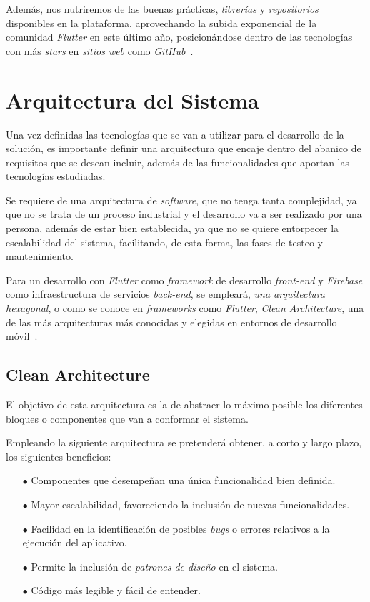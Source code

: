 Además, nos nutriremos de las buenas prácticas, \textit{librerías} y \textit{repositorios} disponibles en la plataforma,
aprovechando la subida exponencial de la comunidad \textit{Flutter} en este último año, posicionándose
dentro de las tecnologías con más \textit{stars} en \textit{sitios web} como \textit{GitHub}~\cite{gittracker}.

\section{Arquitectura del Sistema}
Una vez definidas las tecnologías que se van a utilizar para el desarrollo de la solución, es importante definir una 
arquitectura que encaje dentro del abanico de requisitos que se desean incluir, además de las funcionalidades que
aportan las tecnologías estudiadas.

Se requiere de una arquitectura de \textit{software}, que no tenga tanta complejidad, ya que no se trata de un
proceso industrial y el desarrollo va a ser realizado por una persona, además de estar bien establecida, ya que
no se quiere entorpecer la escalabilidad del sistema, facilitando, de esta forma, las fases de testeo y mantenimiento.

Para un desarrollo con \textit{Flutter} como \textit{framework} de desarrollo \textit{front-end} y \textit{Firebase}
como infraestructura de servicios \textit{back-end}, se empleará, \textit{una arquitectura hexagonal}, o 
como se conoce en \textit{frameworks} como \textit{Flutter}, \textit{Clean Architecture},
una de las más arquitecturas más conocidas y elegidas en entornos de desarrollo móvil~\cite{7053865}.

\subsection{Clean Architecture}
El objetivo de esta arquitectura es la de abstraer lo máximo posible los diferentes bloques o componentes que van a
conformar el sistema. 

Empleando la siguiente arquitectura se pretenderá obtener, a corto y largo plazo,  los siguientes beneficios:

\begin{itemize}
  \item[$\bullet$] Componentes que desempeñan una única funcionalidad bien definida.
  \item[$\bullet$] Mayor escalabilidad, favoreciendo la inclusión de nuevas funcionalidades.
  \item[$\bullet$] Facilidad en la identificación de posibles \textit{bugs} o errores relativos a la
  ejecución del aplicativo.
  \item[$\bullet$] Permite la inclusión de \textit{patrones de diseño} en el sistema.
  \item[$\bullet$] Código más legible y fácil de entender.
\end{itemize}

